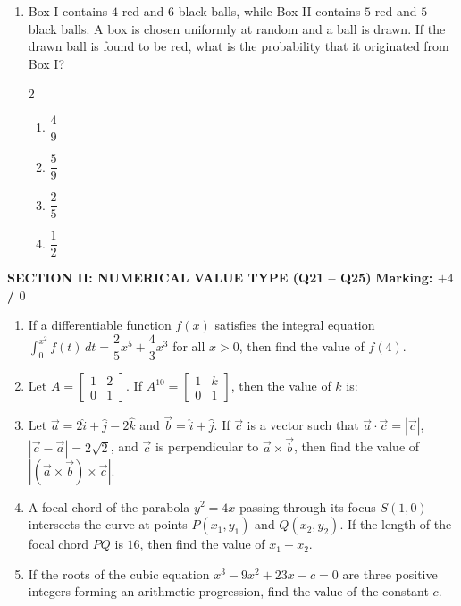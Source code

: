\documentclass[11pt,a4paper]{article}
\begin{document}
\begin{enumerate}[label=\textbf{\arabic*.},leftmargin=18pt,itemsep=12pt]
  \item Box I contains $4$ red and $6$ black balls, while Box II contains $5$ red and $5$ black balls. A box is chosen uniformly at random and a ball is drawn. If the drawn ball is found to be red, what is the probability that it originated from Box I?
  \begin{multicols}{2}
    \begin{enumerate}[label=(\Alph*)]
      \item $\dfrac{4}{9}$
      \item $\dfrac{5}{9}$
      \item $\dfrac{2}{5}$
      \item $\dfrac{1}{2}$
    \end{enumerate}
  \end{multicols}
\end{enumerate}
\vspace{10pt}

\begin{tcolorbox}[sectionbanner]
  {\large \textbf{\textsf{SECTION II: NUMERICAL VALUE TYPE (Q21 -- Q25)}}} \hfill {\small \textbf{Marking: $+4$ / $0$}}
\end{tcolorbox}
\vspace{4pt}
\begin{enumerate}[label=\textbf{\arabic*.},leftmargin=18pt,itemsep=12pt,start=21]

  \item If a differentiable function $f(x)$ satisfies the integral equation $\displaystyle\int_{0}^{x^2} f(t)\, dt = \dfrac{2}{5}x^5 + \dfrac{4}{3}x^3$ for all $x > 0$, then find the value of $f(4)$.

  \item Let $A = \begin{bmatrix} 1 & 2 \\ 0 & 1 \end{bmatrix}$. If $A^{10} = \begin{bmatrix} 1 & k \\ 0 & 1 \end{bmatrix}$, then the value of $k$ is:

  \item Let $\vec{a} = 2\hat{i} + \hat{j} - 2\hat{k}$ and $\vec{b} = \hat{i} + \hat{j}$. If $\vec{c}$ is a vector such that $\vec{a} \cdot \vec{c} = |\vec{c}|$, $|\vec{c} - \vec{a}| = 2\sqrt{2}$, and $\vec{c}$ is perpendicular to $\vec{a} \times \vec{b}$, then find the value of $|(\vec{a} \times \vec{b}) \times \vec{c}|$.

  \item A focal chord of the parabola $y^2 = 4x$ passing through its focus $S(1, 0)$ intersects the curve at points $P(x_1, y_1)$ and $Q(x_2, y_2)$. If the length of the focal chord $PQ$ is $16$, then find the value of $x_1 + x_2$.

  \item If the roots of the cubic equation $x^3 - 9x^2 + 23x - c = 0$ are three positive integers forming an arithmetic progression, find the value of the constant $c$.
\end{enumerate}
\end{document}
